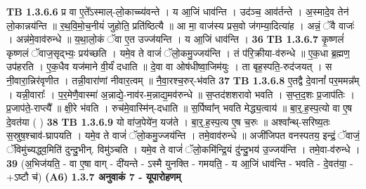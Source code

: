 \documentclass[17pt]{extarticle}
\begin{document}
                  \newline
                                \textbf{ TB 1.3.6.6} \newline
                  प्र वा ए॒ते᳚ऽस्माल्-लो॒काच्च्य॑वन्ते । य आ॒जिं धाव॑न्ति । उद॑ञ्च॒ आव॑र्तन्ते । अ॒स्मादे॒व तेन॑ लो॒कान्नय॑न्ति ॥ र॒थ॒वि॒मो॒च॒नीयं॑ जुहोति॒ प्रति॑ष्ठित्यै ॥ आ मा॒ वाज॑स्य प्रस॒वो ज॑गम्या॒दित्या॑ह । अन्नं॒ ॅवै वाजः॑ । अन्न॑मे॒वाव॑रुन्धे ॥ य॒था॒लो॒कं ॅवा ए॒त उज्ज॑यन्ति । य आ॒जिं धाव॑न्ति । \textbf{ 36} \newline
                  \newline
                                \textbf{ TB 1.3.6.7} \newline
                  कृ॒ष्णलं॑ कृष्णलं ॅवाज॒सृद्भ्यः॒ प्रय॑च्छति । यमे॒व ते वाजं॑ ॅलो॒कमु॒ज्जय॑न्ति । तं प॑रि॒क्रीया-व॑रुन्धे ॥ ए॒क॒धा ब्र॒ह्मण॒ उप॑हरति । ए॒क॒धैव यज॑माने वी॒र्यं॑ दधाति ॥ दे॒वा वा ओष॑धीष्वा॒जिम॑युः । ता बृह॒स्पति॒-रुद॑जयत् । स नी॒वारा॒न्निर॑वृणीत । तन्नी॒वारा॑णां नीवार॒त्वम् ॥ नै॒वा॒रश्च॒रुर्-भ॑वति \textbf{ 37} \newline
                  \newline
                                \textbf{ TB 1.3.6.8} \newline
                  ए॒तद्वै दे॒वानां᳚ पर॒ममन्न᳚म् । यन्नी॒वाराः᳚ । प॒र॒मेणै॒वास्मा॑ अ॒न्नाद्ये॒-नाव॑र-म॒न्नाद्य॒मव॑रुन्धे ॥ स॒प्तद॑शशरावो भवति । स॒प्त॒द॒शः प्र॒जाप॑तिः । प्र॒जाप॑ते॒-राप्त्यै᳚ ॥ क्षी॒रे भ॑वति । रुच॑मे॒वास्मि॑न्-दधाति ॥ स॒र्पिष्वा᳚न् भवति मेद्ध्य॒त्वाय॑ ॥ बा॒र्॒.ह॒स्प॒त्यो वा ए॒ष दे॒वत॑या ( ) \textbf{ 38} \newline
                  \newline
                                \textbf{ TB 1.3.6.9} \newline
                  यो वा॑ज॒पेये॑न॒ यज॑ते । बा॒र्॒.ह॒स्प॒त्य ए॒ष च॒रुः ॥ अश्वा᳚न्थ्-सरिष्य॒तः स॒स्रुष॒श्चाव॑-घ्रापयति । यमे॒व ते वाजं॑ ॅलो॒कमु॒ज्जय॑न्ति । तमे॒वाव॑रुन्धे ॥ अजी॑जिपत वनस्पतय॒ इन्द्रं॒ ॅवाजं॒ ॅविमु॑च्यद्ध्व॒मिति॑ दुन्दु॒भीन्. विमु॑ञ्चति । यमे॒व ते वाजं॑ ॅलो॒कमि॑न्द्रि॒यं दु॑न्दु॒भय॑ उ॒ज्जय॑न्ति । तमे॒वा-व॑रुन्धे । \textbf{ 39} \newline
                  \newline
                                    (अ॒भिज॑यति॒ - वा ए॒षा वाग् - दी॑यन्ते - ऽस्मै युनक्ति - गमयति॒ - य आ॒जिं धाव॑न्ति - भवति - दे॒वत॑या॒ - +ऽष्टौ च॑) \textbf{(A6)} \newline \newline
                \textbf{ 1.3.7      अनुवाकं   7 - यूपारोहणम्} \newline
\end{document}

